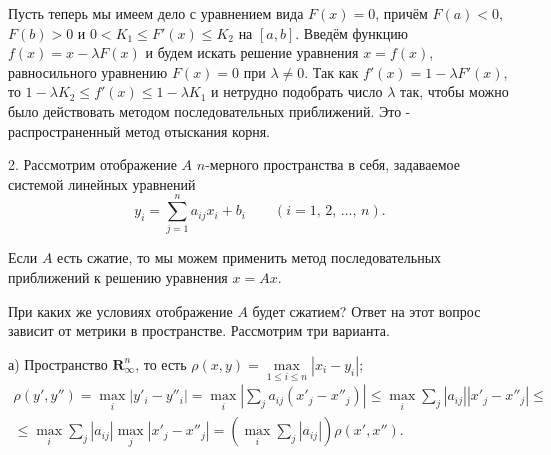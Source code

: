\documentclass[10pt]{book}
\begin{document}
\begin{figure}[h]
\begin{minipage}{.5\textwidth}
  		\caption{}
	\end{minipage}
	\end{figure}


	\par Пусть теперь мы имеем дело с уравнением вида $F(x) = 0$, причём $F(a) < 0$, $F(b) > 0$ и $0 < K_1 \leqslant F'(x) \leqslant K_2$ на $[a, b]$. Введём функцию $f(x) = x - \lambda F(x)$ и будем искать решение уравнения $x = f(x)$, равносильного уравнению $F(x) = 0$ при $\lambda \neq 0$. Так как $f'(x) = 1 - \lambda F'(x)$, то $1 - \lambda K_2 \leqslant f'(x) \leqslant 1 - \lambda K_1$ и нетрудно подобрать число $\lambda$ так, чтобы можно было действовать методом последовательных приближений. Это - распространенный метод отыскания корня.
	\par 2. Рассмотрим отображение $A$ $n$-мерного пространства в себя, задаваемое системой линейных уравнений
	$$y_i = \textstyle\sum\limits_{j = 1}^n a_{ij}x_i + b_i \qquad (i = 1,\,2,\,\dots, \,n).$$
	
	\par Если $A$ есть сжатие, то мы можем применить метод последовательных приближений к решению уравнения $x = Ax$.
	\par При каких же условиях отображение $A$ будет сжатием? Ответ на этот вопрос зависит от метрики в пространстве. Рассмотрим три варианта.
	\par а) Пространство $\boldsymbol{R}_{\infty}^n$, то есть $\rho(x, y) = \max\limits_{1 \leqslant i \leqslant n} |x_i - y_i|$;
	\begin{multline*}
		\textstyle\rho(y', y'') = \max\limits_i|y'_i - y''_i| = \max\limits_i|\sum\limits_ja_{ij}(x'_j -x''_j)| 
		\leqslant \max\limits_i \sum\limits_j|a_{ij}| |x'_j - x''_j| \leqslant \\ \textstyle\leqslant\max\limits_i \sum\limits_j|a_{ij}|\max\limits_j|x'_j - x''_j|
		= (\max\limits_i \sum\limits_j |a_{ij}|)\rho(x', x'').
	\end{multline*}
	
\end{document}
